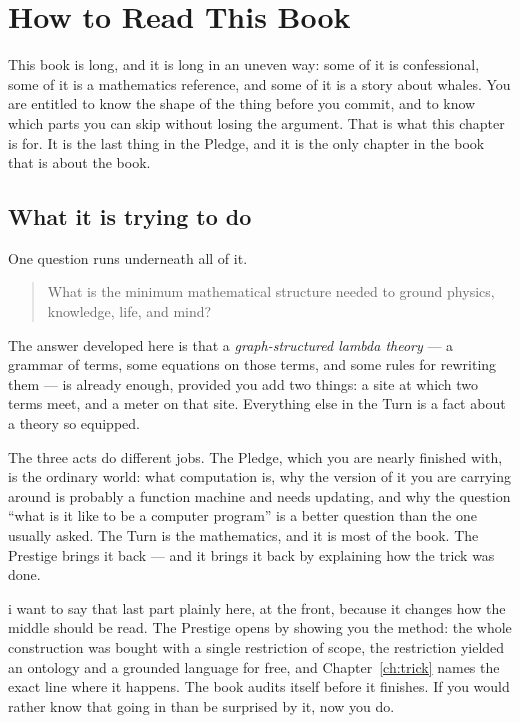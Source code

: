 \chapter*{How to Read This Book}
\label{ch:map}
\renewcommand{\thefigure}{\Alph{figure}}\setcounter{figure}{0}

This book is long, and it is long in an uneven way: some of it is
confessional, some of it is a mathematics reference, and some of it
is a story about whales.
You are entitled to know the shape of the thing before you commit,
and to know which parts you can skip without losing the argument.
That is what this chapter is for.
It is the last thing in the Pledge, and it is the only chapter in
the book that is about the book.

\section*{What it is trying to do}

One question runs underneath all of it.

\begin{quote}
What is the minimum mathematical structure needed to ground
physics, knowledge, life, and mind?
\end{quote}

\noindent
The answer developed here is that a \emph{graph-structured lambda
theory} --- a grammar of terms, some equations on those terms, and
some rules for rewriting them --- is already enough, provided you
add two things: a site at which two terms meet, and a meter on that
site.
Everything else in the Turn is a fact about a theory so equipped.

The three acts do different jobs.
The Pledge, which you are nearly finished with, is the ordinary
world: what computation is, why the version of it you are carrying
around is probably a function machine and needs updating, and why
the question ``what is it like to be a computer program'' is a
better question than the one usually asked.
The Turn is the mathematics, and it is most of the book.
The Prestige brings it back --- and it brings it back by explaining
how the trick was done.

i want to say that last part plainly here, at the front, because it
changes how the middle should be read.
The Prestige opens by showing you the method: the whole
construction was bought with a single restriction of scope, the
restriction yielded an ontology and a grounded language for free,
and Chapter~\ref{ch:trick} names the exact line where it happens.
The book audits itself before it finishes.
If you would rather know that going in than be surprised by it,
now you do.

